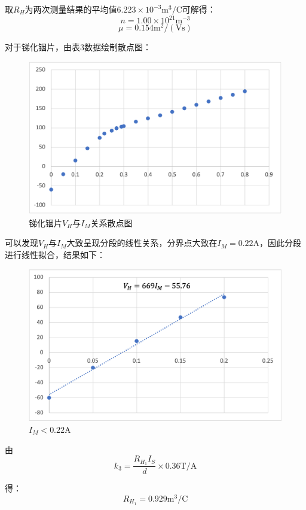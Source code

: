 \documentclass[UTF8]{ctexart}
\begin{document}
取$R_H$为两次测量结果的平均值$6.223\times 10^{-3}\mathrm{m^3/C}$可解得：
\[n = 1.00\times 10^{21}\mathrm{m^{-3}}\]
\[\mu = 0.154\mathrm{m^2/(Vs)}\]

对于锑化铟片，由表3数据绘制散点图：

\begin{figure}[h]
  \centering
  \includegraphics[scale=0.7]{p5.png}
  \caption{锑化铟片$V_H$与$I_M$关系散点图}
\end{figure}

可以发现$V_H$与$I_M$大致呈现分段的线性关系，分界点大致在$I_M=0.22\mathrm{A}$，因此分段进行线性拟合，结果如下：
\begin{figure}[h]
  \centering
  \includegraphics[scale=0.7]{p6.png}
  \caption{$I_M<0.22\mathrm{A}$}
\end{figure}

由
\[k_3 = \frac{R_{H_1}I_S}{d}\times 0.36\mathrm{T/A}\]

得：
\[R_{H_1} = 0.929\mathrm{m^3/C}\]
\end{document}
